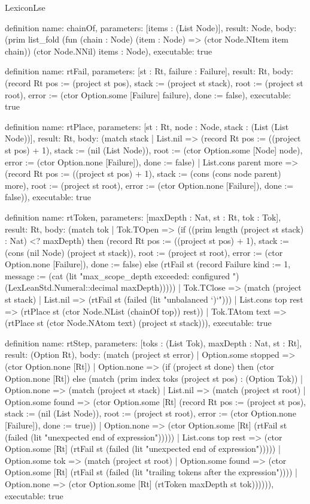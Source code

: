 \begin{lexlean}{LexiconLse}
\begin{semanticmodule}
definition{
  name: chainOf,
  parameters: [items : (List Node)],
  result: Node,
  body: (prim list_fold (fun (chain : Node) (item : Node) => (ctor Node.NItem item chain)) (ctor Node.NNil) items : Node),
  executable: true
}

definition{
  name: rtFail,
  parameters: [st : Rt, failure : Failure],
  result: Rt,
  body: (record Rt {pos := (project st pos), stack := (project st stack), root := (project st root), error := (ctor Option.some [Failure] failure), done := false}),
  executable: true
}

definition{
  name: rtPlace,
  parameters: [st : Rt, node : Node, stack : (List (List Node))],
  result: Rt,
  body: (match stack
    | List.nil => (record Rt {pos := ((project st pos) + 1), stack := (nil (List Node)), root := (ctor Option.some [Node] node), error := (ctor Option.none [Failure]), done := false})
    | List.cons parent more => (record Rt {pos := ((project st pos) + 1), stack := (cons (cons node parent) more), root := (project st root), error := (ctor Option.none [Failure]), done := false})),
  executable: true
}

definition{
  name: rtToken,
  parameters: [maxDepth : Nat, st : Rt, tok : Tok],
  result: Rt,
  body: (match tok
    | Tok.TOpen => (if ((prim length (project st stack) : Nat) <? maxDepth) then (record Rt {pos := ((project st pos) + 1), stack := (cons (nil Node) (project st stack)), root := (project st root), error := (ctor Option.none [Failure]), done := false}) else (rtFail st (record Failure {kind := 1, message := (cat (lit "max_scope_depth exceeded: configured ") (LexLeanStd.Numeral::decimal maxDepth))})))
    | Tok.TClose => (match (project st stack)
      | List.nil => (rtFail st (failed (lit "unbalanced `)`")))
      | List.cons top rest => (rtPlace st (ctor Node.NList (chainOf top)) rest))
    | Tok.TAtom text => (rtPlace st (ctor Node.NAtom text) (project st stack))),
  executable: true
}

definition{
  name: rtStep,
  parameters: [toks : (List Tok), maxDepth : Nat, st : Rt],
  result: (Option Rt),
  body: (match (project st error)
    | Option.some stopped => (ctor Option.none [Rt])
    | Option.none => (if (project st done) then (ctor Option.none [Rt]) else (match (prim index toks (project st pos) : (Option Tok))
      | Option.none => (match (project st stack)
        | List.nil => (match (project st root)
          | Option.some found => (ctor Option.some [Rt] (record Rt {pos := (project st pos), stack := (nil (List Node)), root := (project st root), error := (ctor Option.none [Failure]), done := true}))
          | Option.none => (ctor Option.some [Rt] (rtFail st (failed (lit "unexpected end of expression")))))
        | List.cons top rest => (ctor Option.some [Rt] (rtFail st (failed (lit "unexpected end of expression")))))
      | Option.some tok => (match (project st root)
        | Option.some found => (ctor Option.some [Rt] (rtFail st (failed (lit "trailing tokens after the expression"))))
        | Option.none => (ctor Option.some [Rt] (rtToken maxDepth st tok)))))),
  executable: true
}


\end{semanticmodule}
\end{lexlean}
